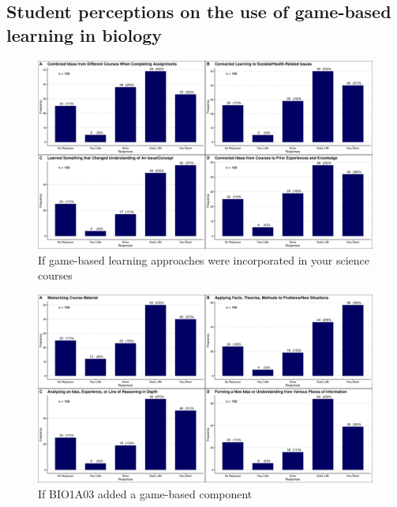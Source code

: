 \documentclass{article}
\begin{document}
\subsection{Student perceptions on the use of game-based learning in biology}

\begin{figure}[H]
	\includegraphics[width=\textwidth]{figures_4f06/how_does_gbl_help_in_science.jpg}
	\caption{If game-based learning approaches were incorporated in your science courses}
	\label{fig:5}
\end{figure}

\begin{figure}[H]
	\includegraphics[width=\textwidth]{figures_4f06/ifbio1a03_added_gblcomponent.jpg}
	\caption{If BIO1A03 added a game-based component}
	\label{fig:6}
\end{figure}
\end{document}
